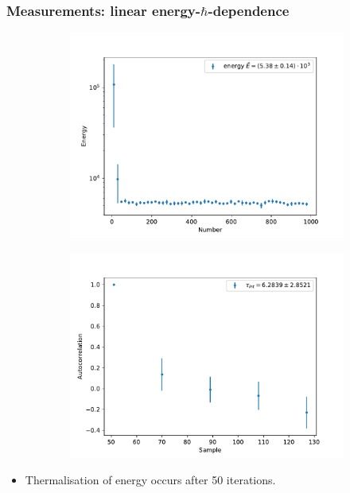 \documentclass[aspectratio=169]{beamer}
\begin{document}
\begin{frame}
	\frametitle{Measurements: linear energy-$\hbar$-dependence}
	\begin{figure}[H]
		\centering
			\begin{subfigure}[c]{0.45\textwidth}
				\includegraphics[width=\textwidth]{../imgs/harmonic_oscillator_track/track_10001000_thermalisation_log.pdf}
			\end{subfigure}
			\begin{subfigure}[c]{0.45\textwidth}
				\includegraphics[width=\textwidth]{../imgs/harmonic_oscillator_track/track_10001000_thermalisation_log_autocorrelation.pdf}
			\end{subfigure}
		\label{fig:harmonic_oscillator_energy_measurement}
	\end{figure}
	\begin{itemize}
		\item Thermalisation of energy occurs after 50 iterations.
	\end{itemize}
\end{frame}
\end{document}
